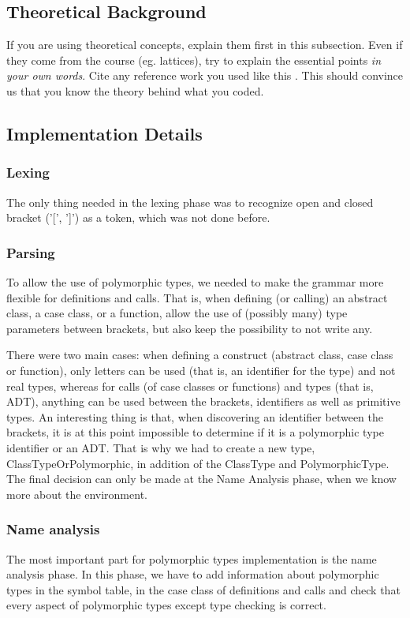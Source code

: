 \subsection{Theoretical Background}
If you are using theoretical concepts, explain them first in this subsection.
Even if they come from the course (eg. lattices), try to explain the essential
points \emph{in your own words}. Cite any reference work you used like this
\cite{TigerBook}. This should convince us that you know the theory behind what
you coded. 

\subsection{Implementation Details}
\subsubsection{Lexing}
The only thing needed in the lexing phase was to recognize open and closed bracket ('[', ']') as a token, which was not done before.
\subsubsection{Parsing}
To allow the use of polymorphic types, we needed to make the grammar more flexible for definitions and calls. That is, when defining (or calling) an abstract class, a case class, or a function, allow the use of (possibly many) type parameters between brackets, but also keep the possibility to not write any. 

There were two main cases: when defining a construct (abstract class, case class or function), only letters can be used (that is, an identifier for the type) and not real types, whereas for calls (of case classes or functions) and types (that is, ADT), anything can be used between the brackets, identifiers as well as primitive types. An interesting thing is that, when discovering an identifier between the brackets, it is at this point impossible to determine if it is a polymorphic type identifier or an ADT. That is why we had to create a new type, ClassTypeOrPolymorphic, in addition of the ClassType and PolymorphicType. The final decision can only be made at the Name Analysis phase, when we know more about the environment.
\subsubsection{Name analysis}
The most important part for polymorphic types implementation is the name analysis phase. In this phase, we have to add information about polymorphic types in the symbol table, in the case class of definitions and calls and check that every aspect of polymorphic types except type checking is correct.

